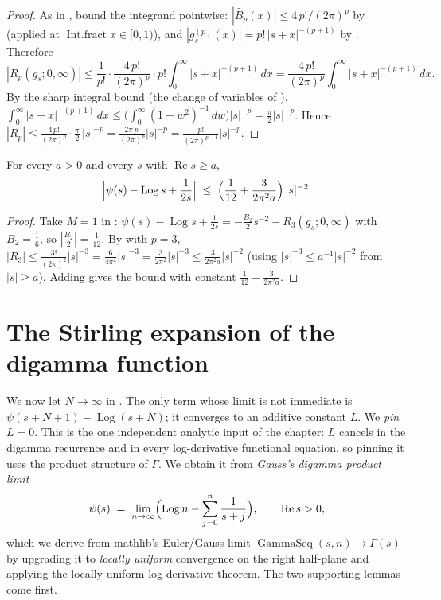 \begin{proof}
\leanok
{}
As in , bound the integrand pointwise:
$|\widetilde{B_p}(x)|\le 4\,p!/(2\pi)^p$ by  (applied at
$\operatorname{Int.fract}x\in[0,1)$), and $|g_s^{(p)}(x)|=p!\,|s+x|^{-(p+1)}$ by
. Therefore
\[
  |R_p(g_s;0,\infty)|
  \le \frac{1}{p!}\cdot\frac{4\,p!}{(2\pi)^p}\cdot p!\int_0^\infty|s+x|^{-(p+1)}\,dx
  = \frac{4\,p!}{(2\pi)^p}\int_0^\infty|s+x|^{-(p+1)}\,dx .
\]
By the sharp integral bound (the change of variables of ),
$\int_0^\infty|s+x|^{-(p+1)}\,dx\le\bigl(\int_0^\infty(1+w^2)^{-1}\,dw\bigr)|s|^{-p}
=\tfrac{\pi}{2}|s|^{-p}$. Hence
$|R_p|\le \tfrac{4\,p!}{(2\pi)^p}\cdot\tfrac\pi2\,|s|^{-p}
= \tfrac{2\pi\,p!}{(2\pi)^p}|s|^{-p}=\tfrac{p!}{(2\pi)^{p-1}}|s|^{-p}$.
\end{proof}

\begin{corollary}
\label{cor:gs_digamma_first_order_explicit}
\leanok
{}
For every $a>0$ and every $s$ with $\operatorname{Re}s\ge a$,
\[
  \Bigl|\psi(s)-\operatorname{Log}s+\frac{1}{2s}\Bigr|
  \;\le\; \Bigl(\frac{1}{12}+\frac{3}{2\pi^{2}a}\Bigr)\,\lvert s\rvert^{-2} .
\]
\end{corollary}

\begin{proof}
\leanok
{}
Take $M=1$ in :
$\psi(s)-\operatorname{Log}s+\tfrac1{2s}=-\tfrac{B_2}{2}s^{-2}-R_3(g_s;0,\infty)$ with
$B_2=\tfrac16$, so $|\tfrac{B_2}{2}|=\tfrac1{12}$. By
 with $p=3$,
$|R_3|\le \tfrac{3!}{(2\pi)^2}|s|^{-3}=\tfrac{6}{4\pi^2}|s|^{-3}=\tfrac{3}{2\pi^2}|s|^{-3}
\le\tfrac{3}{2\pi^2 a}|s|^{-2}$ (using $|s|^{-3}\le a^{-1}|s|^{-2}$ from $|s|\ge a$).
Adding gives the bound with constant $\tfrac1{12}+\tfrac{3}{2\pi^2 a}$.
\end{proof}

\section{The Stirling expansion of the digamma function}
\label{sec:gs_stirling}

We now let $N\to\infty$ in . The only term whose limit is not
immediate is $\psi(s+N+1)-\operatorname{Log}(s+N)$; it converges to an additive
constant $L$. We \emph{pin} $L=0$. This is the one independent analytic input of the
chapter: $L$ cancels in the digamma recurrence and in every log-derivative
functional equation, so pinning it uses the product structure of $\Gamma$. We obtain it from \emph{Gauss's
digamma product limit}
\[
  \psi(s) \;=\; \lim_{n\to\infty}\Bigl(\operatorname{Log}n-\sum_{j=0}^{n}\frac1{s+j}\Bigr),
  \qquad \operatorname{Re}s>0,
\]
which we derive from mathlib's Euler/Gauss limit $\operatorname{GammaSeq}(s,n)\to
\Gamma(s)$ by upgrading it to \emph{locally uniform} convergence on the right
half-plane and applying the locally-uniform log-derivative theorem. The two
supporting lemmas come first.

